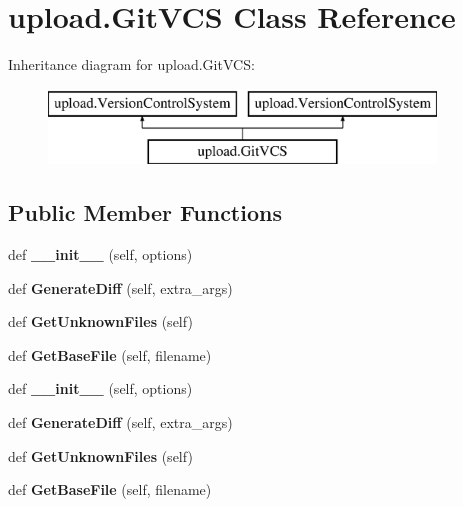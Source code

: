 \hypertarget{classupload_1_1GitVCS}{}\section{upload.\+Git\+V\+CS Class Reference}
\label{classupload_1_1GitVCS}
Inheritance diagram for upload.\+Git\+V\+CS\+:\begin{figure}[H]
\begin{center}
\leavevmode
\includegraphics[height=2.000000cm]{classupload_1_1GitVCS}
\end{center}
\end{figure}
\subsection*{Public Member Functions}
\begin{DoxyCompactItemize}
\item 
\mbox{\label{classupload_1_1GitVCS_aba4e1dca1c4b3e5db7ba07f6bce3c839}} 
def {\bfseries \+\_\+\+\_\+init\+\_\+\+\_\+} (self, options)
\item 
\mbox{\label{classupload_1_1GitVCS_a3ebfc01cebc9b585706ad3f4389a8833}} 
def {\bfseries Generate\+Diff} (self, extra\+\_\+args)
\item 
\mbox{\label{classupload_1_1GitVCS_ae4e8c0e9fa01619c6a5c76d1ab84b995}} 
def {\bfseries Get\+Unknown\+Files} (self)
\item 
\mbox{\label{classupload_1_1GitVCS_a70ddb65a6b512b8cb8cc4affa37ff9b4}} 
def {\bfseries Get\+Base\+File} (self, filename)
\item 
\mbox{\label{classupload_1_1GitVCS_aba4e1dca1c4b3e5db7ba07f6bce3c839}} 
def {\bfseries \+\_\+\+\_\+init\+\_\+\+\_\+} (self, options)
\item 
\mbox{\label{classupload_1_1GitVCS_a3ebfc01cebc9b585706ad3f4389a8833}} 
def {\bfseries Generate\+Diff} (self, extra\+\_\+args)
\item 
\mbox{\label{classupload_1_1GitVCS_ae4e8c0e9fa01619c6a5c76d1ab84b995}} 
def {\bfseries Get\+Unknown\+Files} (self)
\item 
\mbox{\label{classupload_1_1GitVCS_a70ddb65a6b512b8cb8cc4affa37ff9b4}} 
def {\bfseries Get\+Base\+File} (self, filename)
\end{DoxyCompactItemize}
